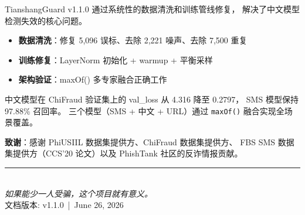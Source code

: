 \documentclass[11pt,a4paper]{article}
\begin{document}
TianshangGuard v1.1.0 通过系统性的数据清洗和训练管线修复，
解决了中文模型检测失效的核心问题。

\begin{itemize}
  \item \textbf{数据清洗}：修复 5,096 误标、去除 2,221 噪声、去除 7,500 重复
  \item \textbf{训练修复}：LayerNorm 初始化 + warmup + 平衡采样
  \item \textbf{架构验证}：maxOf() 多专家融合正确工作
\end{itemize}

中文模型在 ChiFraud 验证集上的 val\_loss 从 4.316 降至 0.2797，
SMS 模型保持 97.88\% 召回率。
三个模型（SMS + 中文 + URL）通过 \texttt{maxOf()} 融合实现全场景覆盖。

\textbf{致谢}：感谢 PhiUSIIL 数据集提供方、ChiFraud 数据集提供方、
FBS SMS 数据集提供方（CCS'20 论文）以及 PhishTank 社区的反诈情报贡献。

\vspace{0.5cm}
\begin{center}
\rule{0.3\textwidth}{0.5pt}\\
{\small\color{primaryblue} \textit{如果能少一人受骗，这个项目就有意义。}}\\
{\small 文档版本: v1.1.0 \,|\, June 26, 2026}
\end{center}
\end{document}
